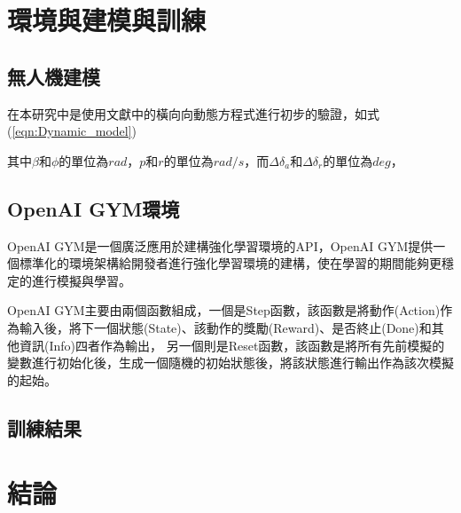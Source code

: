 \documentclass[a4paper, onecolumn, 11pt, AutoFakeBold]{article}
\newcommand{\texttwelve}{\fontsize{12}{12}\selectfont}
\renewcommand{\eqref}[1]{式(\ref{#1})}
\begin{document}
\begin{multicols*}{2}
\smallskip
\section{環境與建模與訓練}
\subsection{無人機建模}
在本研究中是使用文獻\cite{Optimal_Sliding_Mode_Controller_for_Fixed-wing_UAV}中的橫向向動態方程式進行初步的驗證，如\eqref{eqn:Dynamic_model}

\noindent 其中$\beta$和$\phi$的單位為$rad$，$p$和$r$的單位為$rad/s$，而$\Delta \delta_a$和$\Delta \delta_r$的單位為$deg$，

\subsection{OpenAI GYM環境}
\par
OpenAI GYM是一個廣泛應用於建構強化學習環境的API，OpenAI GYM提供一個標準化的環境架構給開發者進行強化學習環境的建構，使在學習的期間能夠更穩定的進行模擬與學習。
\par
OpenAI GYM主要由兩個函數組成，一個是Step函數，該函數是將動作(Action)作為輸入後，將下一個狀態(State)、該動作的獎勵(Reward)、是否終止(Done)和其他資訊(Info)四者作為輸出，
\noindent 另一個則是Reset函數，該函數是將所有先前模擬的變數進行初始化後，生成一個隨機的初始狀態後，將該狀態進行輸出作為該次模擬的起始。

\smallskip
\subsection{訓練結果}

\smallskip
\section{結論}

\smallskip
\titleformat{\section}{\bfseries\texttwelve}{}{0em}{}
\printbibliography[title={參考文獻}]

\end{multicols*}
\end{document}
